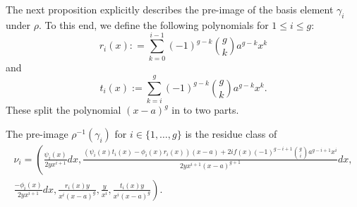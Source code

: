The next proposition explicitly describes the pre-image of the basis element $\gamma_i$ under $\rho$.
To this end, we define the following polynomials for $1 \leq i \leq g$:
    \[
    r_i(x) : = \sum_{k=0}^{i-1} (-1)^{g-k}\binom{g}{k} a^{g-k} x^k
    \]
and
    \[
    t_i(x) := \sum_{k=i}^{g} (-1)^{g-k}\binom{g}{k} a^{g-k} x^k.
    \]
These split the polynomial $(x-a)^g$ in to two parts.


    \begin{prop}\label{propbasisoftriplecoverderham}
    The pre-image $\rho^{-1}(\gamma_i)$ for $i \in \{1, \ldots, g\}$ is the residue class of
        \begin{multline*}
        \nu_i = \left(\frac{\psi_i(x)}{2yx^{i+1}}dx, \frac{(\psi_i(x)t_i(x) - \phi_i(x)r_i(x))(x-a) + 2if(x)(-1)^{g-i+1}\binom{g}{i} a^{g-i+1}x^i}{2yx^{i+1}(x-a)^{g+1}}dx,\right. \\\left. \frac{-\phi_i(x)}{2yx^{i+1}}dx,  \frac{r_i(x)y}{x^i(x-a)^g}, \frac{y}{x^i},  \frac{t_i(x)y}{x^i(x-a)^g} \right).
        \end{multline*}
    \end{prop}
